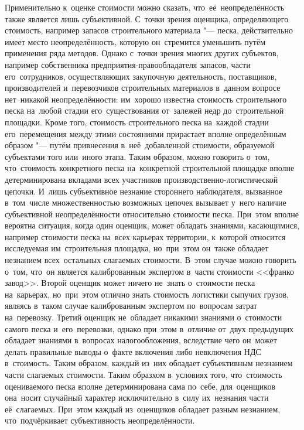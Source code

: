 \documentclass[]{scrartcl}
\begin{document}
Применительно к~оценке стоимости можно сказать, что~её~неопределённость также является лишь субъективной. С~точки зрения оценщика, определяющего стоимость, например запасов строительного материала "--- песка, действительно имеет место неопределённость, которую он~стремится уменьшить путём применения ряда методов. Однако с~точки зрения многих других субъектов, например собственника предприятия-правообладателя запасов, части его~сотрудников, осуществляющих закупочную деятельность, поставщиков, производителей и~перевозчиков строительных материалов в~данном вопросе нет~никакой неопределённости: им~хорошо известна  стоимость строительного песка на~любой стадии его~существования от~залежей недр до~строительной площадки. Кроме того, стоимость строительного песка на~каждой стадии его~перемещения между этими состояниями прирастает вполне определённым образом "--- путём привнесения в~неё~добавленной стоимости, образуемой субъектами того или~иного этапа. Таким образом, можно говорить о~том, что~стоимость конкретного песка на~конкретной строительной площадке вполне детерминирована вкладами всех участников производственно-логистической цепочки. И~лишь субъективное незнание стороннего наблюдателя, вызванное в~том~числе множественностью возможных цепочек вызывает у~него наличие субъективной неопределённости относительно стоимости песка. При~этом вполне вероятна ситуация, когда один оценщик, может обладать знаниями, касающимися, например стоимости песка на~всех карьерах территории, к~которой относится исследуемая им~строительная площадка, но~при~этом он~также обладает незнанием всех~остальных слагаемых стоимости. В~этом случае можно говорить о~том, что~он является калиброванным экспертом в~части стоимости <<франко завод>>. Второй оценщик может ничего не~знать о~стоимости песка на~карьерах, но~при~этом отлично знать стоимость логистики сыпучих грузов, являясь в~таком случае калиброванным экспертом по~вопросам затрат на~перевозку. Третий оценщик не~обладает никакими знаниями о~стоимости самого песка и~его~перевозки, однако при~этом в~отличие от~двух предыдущих обладает знаниями в~вопросах налогообложения, вследствие чего он~может делать правильные выводы о~факте включения либо невключения НДС в~стоимость. Таким образом, каждый из~них обладает субъективным незнанием части слагаемых стоимости. Таким образхом в~условиях того, что~стоимость оцениваемого песка вполне детерминирована сама по~себе, для~оценщиков она~носит случайный характер исключительно в~силу их~незнания части её~слагаемых. При~этом каждый из~оценщиков обладает разным незнанием, что~подчёркивает субъективность неопределённости.
\end{document}
